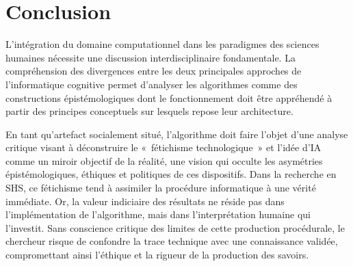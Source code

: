 \documentclass[fra, final]{anthology-ch}
\begin{document}
\section{Conclusion}

L’intégration du domaine computationnel dans les paradigmes des sciences humaines nécessite une discussion interdisciplinaire fondamentale. La compréhension des divergences entre les deux principales approches de l’informatique cognitive permet d’analyser les algorithmes comme des constructions épistémologiques dont le fonctionnement doit être appréhendé à partir des principes conceptuels sur lesquels repose leur architecture.

En tant qu’artefact socialement situé, l'algorithme doit faire l'objet d'une analyse critique visant à déconstruire le «~fétichisme technologique~» \cite{dean2025} et l'idée d'IA comme un miroir objectif de la réalité, une vision qui occulte les asymétries épistémologiques, éthiques et politiques de ces dispositifs. Dans la recherche en SHS, ce fétichisme tend à assimiler la procédure informatique à une vérité immédiate. Or, la valeur indiciaire des résultats ne réside pas dans l’implémentation de l’algorithme, mais dans l’interprétation humaine qui l'investit. Sans conscience critique des limites de cette production procédurale, le chercheur risque de confondre la trace technique avec une connaissance validée, compromettant ainsi l'éthique et la rigueur de la production des savoirs.




\nocite{*}

\printbibliography
\end{document}
